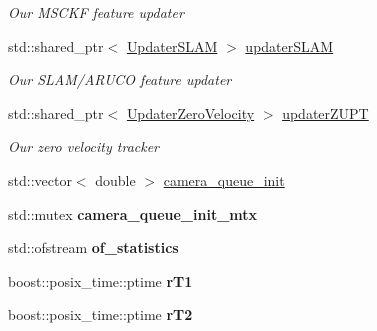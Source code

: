 \begin{DoxyCompactItemize}
\begin{DoxyCompactList}\small\item\em Our M\+S\+C\+KF feature updater \end{DoxyCompactList}\item 
\mbox{\label{classov__msckf_1_1VioManager_aeb2ad853d87a8f2b387db3cff18cdb0e}} 
std\+::shared\+\_\+ptr$<$ \hyperlink{classov__msckf_1_1UpdaterSLAM}{Updater\+S\+L\+AM} $>$ \hyperlink{classov__msckf_1_1VioManager_aeb2ad853d87a8f2b387db3cff18cdb0e}{updater\+S\+L\+AM}
\begin{DoxyCompactList}\small\item\em Our S\+L\+A\+M/\+A\+R\+U\+CO feature updater \end{DoxyCompactList}\item 
\mbox{\label{classov__msckf_1_1VioManager_a94e1136ce9798ad776a19baceee5580c}} 
std\+::shared\+\_\+ptr$<$ \hyperlink{classov__msckf_1_1UpdaterZeroVelocity}{Updater\+Zero\+Velocity} $>$ \hyperlink{classov__msckf_1_1VioManager_a94e1136ce9798ad776a19baceee5580c}{updater\+Z\+U\+PT}
\begin{DoxyCompactList}\small\item\em Our zero velocity tracker \end{DoxyCompactList}\item 
std\+::vector$<$ double $>$ \hyperlink{classov__msckf_1_1VioManager_a3d64db49753d6ae3ae946257c1a8e184}{camera\+\_\+queue\+\_\+init}
\item 
\mbox{\label{classov__msckf_1_1VioManager_a596b2a9f732e4c412d5c1e85d9b9eba3}} 
std\+::mutex {\bfseries camera\+\_\+queue\+\_\+init\+\_\+mtx}
\item 
\mbox{\label{classov__msckf_1_1VioManager_a2a945d55d74eeb81eb3a6ef1f774d0c9}} 
std\+::ofstream {\bfseries of\+\_\+statistics}
\item 
\mbox{\label{classov__msckf_1_1VioManager_aa25c347d35e5c3d0fab18c19179a95ea}} 
boost\+::posix\+\_\+time\+::ptime {\bfseries r\+T1}
\item 
\mbox{\label{classov__msckf_1_1VioManager_adc8f8ef4cfe2bc9ce3e45e398b3d7082}} 
boost\+::posix\+\_\+time\+::ptime {\bfseries r\+T2}

\end{DoxyCompactItemize}

